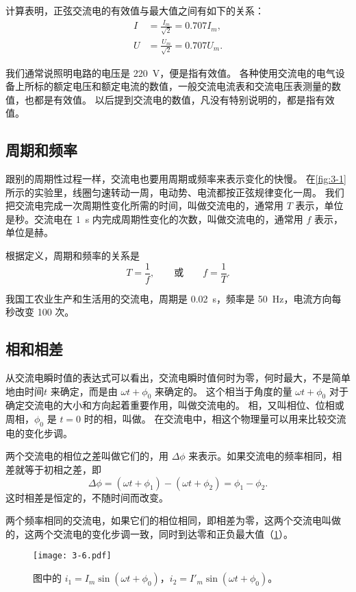 计算表明，正弦交流电的有效值与最大值之间有如下的关系：
\[\begin{split}
   I&=\frac{I_m}{\sqrt{2}}=0.707I_m,\\
   U&=\frac{U_m}{\sqrt{2}}=0.707U_m. 
\end{split}\]

我们通常说照明电路的电压是 \qty{220}{V}，便是指有效值。
各种使用交流电的电气设备上所标的额定电压和额定电流的数值，一般交流电流表和交流电压表测量的数值，也都是有效值。
以后提到交流电的数值，凡没有特别说明的，都是指有效值。

\subsection{周期和频率}
跟别的周期性过程一样，交流电也要用周期或频率来表示变化的快慢。
在\cref{fig:3-1} 所示的实验里，线圈匀速转动一周，电动势、电流都按正弦规律变化一周。
我们把交流电完成一次周期性变化所需的时间，叫做交流电的，通常用 $T$ 表示，单位是秒。交流电在 \qty{1}{s} 内完成周期性变化的次数，叫做交流电的，通常用 $f$ 表示，单位是赫。

根据定义，周期和频率的关系是
\[T=\frac{1}{f},\qquad\text{或}\qquad f=\frac{1}{T}.\]
	
我国工农业生产和生活用的交流电，周期是 \qty{0.02}{s}，频率是 \qty{50}{Hz}，电流方向每秒改变 100 次。

\subsection{相和相差}

从交流电瞬时值的表达式可以看出，交流电瞬时值何时为零，何时最大，不是简单地由时间$t$ 来确定，而是由 $\omega t+\phi_0$ 来确定的。
这个相当于角度的量 $\omega t+\phi_0$ 对于确定交流电的大小和方向起着重要作用，叫做交流电的。
相，又叫相位、位相或周相，$\phi_0$ 是 $t=0$ 时的相，叫做。
在交流电中，相这个物理量可以用来比较交流电的变化步调。

两个交流电的相位之差叫做它们的，用 $\Delta \phi$ 来表示。如果交流电的频率相同，相差就等于初相之差，即
\[\Delta \phi=(\omega t+\phi_1)-(\omega t+\phi_2)=\phi_1-\phi_2.\]
这时相差是恒定的，不随时间而改变。

两个频率相同的交流电，如果它们的相位相同，即相差为零，这两个交流电叫做的，这两个交流电的变化步调一致，同时到达零和正负最大值（\cref{fig:3-6}）。	
\begin{figure}
  \texttt{[image: 3-6.pdf]}
  \caption{图中的 $i_1=I_m\sin(\omega t+\phi_0)$，$i_2=I'_m\sin(\omega t+\phi_0)$。}\label{fig:3-6}
\end{figure}

